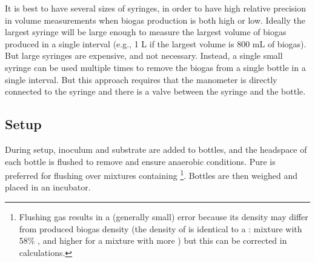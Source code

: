 \documentclass[]{article}
\begin{document}
It is best to have several sizes of syringes, in order to have high relative precision in volume measurements when biogas production is both high or low.
Ideally the largest syringe will be large enough to measure the largest volume of biogas produced in a single interval (e.g., 1 L if the largest volume is 800 mL of biogas).
But large syringes are expensive, and not necessary.
Instead, a single small syringe can be used multiple times to remove the biogas from a single bottle in a single interval.
But this approach requires that the manometer is directly connected to the syringe and there is a valve between the syringe and the bottle.

\subsection{Setup}
During setup, inoculum and substrate are added to bottles, and the headspace of each bottle is flushed to remove  and ensure anaerobic conditions. 
Pure  is preferred for flushing over mixtures containing \footnote{
Flushing gas results in a (generally small) error because its density may differ from produced biogas density (the density of  is identical to a : mixture with 58\% , and higher for a mixture with more ) but this can be corrected in calculations. 
}.
Bottles are then weighed and placed in an incubator.
\end{document}
